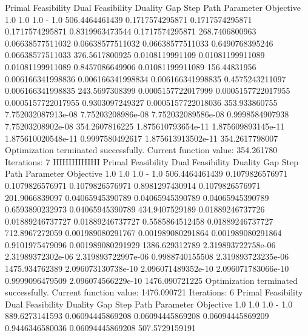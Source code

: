 \documentclass[letterpaper,10pt,english]{sphinxmanual}
\begin{document}
{
\begin{sphinxVerbatim}[commandchars=\\\{\}]
Primal Feasibility  Dual Feasibility    Duality Gap         Step             Path Parameter      Objective
1.0                 1.0                 1.0                 -                1.0                 506.4464461439
0.1717574295871     0.1717574295871     0.1717574295871     0.8319963473544  0.1717574295871     268.7406800963
0.06638577511032    0.06638577511032    0.06638577511033    0.6490768395246  0.06638577511033    376.5617800925
0.0108119991109     0.01081199911089    0.01081199911089    0.8457086649906  0.01081199911089    156.44831956
0.006166341998836   0.006166341998834   0.006166341998835   0.4575243211097  0.006166341998835   243.5697308399
0.0005157722017999  0.0005157722017955  0.0005157722017955  0.9303097249327  0.0005157722018036  353.933860755
7.752032087913e-08  7.75203208986e-08   7.752032089586e-08  0.9998584907938  7.75203208902e-08   354.2607816225
1.875610793654e-11  1.875609893145e-11  1.875610020548e-11  0.9997580492617  1.875613913502e-11  354.2617798007
Optimization terminated successfully.
         Current function value: 354.261780
         Iterations: 7
HIHIHIHIHI
Primal Feasibility  Dual Feasibility    Duality Gap         Step             Path Parameter      Objective
1.0                 1.0                 1.0                 -                1.0                 506.4464461439
0.1079826576971     0.1079826576971     0.1079826576971     0.8981297430914  0.1079826576971     201.9066839097
0.04065945390789    0.04065945390789    0.04065945390789    0.6593890232973  0.04065945390789    434.9407529189
0.01889246737726    0.01889246737727    0.01889246737727    0.5585864512458  0.01889246737727    712.8967272059
0.001989080291767   0.001989080291864   0.001989080291864   0.9101975479096  0.001989080291929   1386.629312789
2.319893722758e-06  2.31989372302e-06   2.319893722997e-06  0.9988740155508  2.319893723235e-06  1475.934762389
2.096073130738e-10  2.096071489352e-10  2.096071783066e-10  0.9999096479509  2.096074566229e-10  1476.090721225
Optimization terminated successfully.
         Current function value: 1476.090721
         Iterations: 6
Primal Feasibility  Dual Feasibility    Duality Gap         Step             Path Parameter      Objective
1.0                 1.0                 1.0                 -                1.0                 889.6273141593
0.06094445869208    0.06094445869208    0.06094445869209    0.9446346580036  0.06094445869208    507.5729159191

\end{sphinxVerbatim}}
\end{document}
